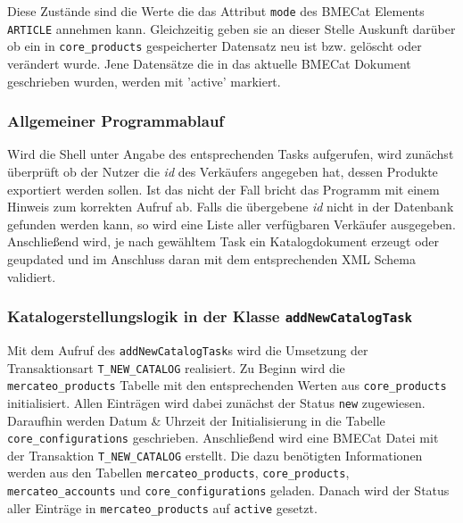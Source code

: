 	Diese Zustände sind die Werte die das Attribut \texttt{mode} des BMECat Elements \texttt{ARTICLE} annehmen kann. Gleichzeitig geben sie an dieser Stelle Auskunft darüber ob ein in \texttt{core\_products} gespeicherter Datensatz neu ist bzw. gelöscht oder verändert wurde. Jene Datensätze die in das aktuelle BMECat Dokument geschrieben wurden, werden mit 'active' markiert.
	
	\subsubsection{Allgemeiner Programmablauf}
	
	Wird die Shell unter Angabe des entsprechenden Tasks aufgerufen, wird zunächst überprüft ob der Nutzer die \textit{id} des Verkäufers angegeben hat, dessen Produkte exportiert werden sollen. Ist das nicht der Fall bricht das Programm mit einem Hinweis zum korrekten Aufruf ab. Falls die übergebene \textit{id} nicht in der Datenbank gefunden werden kann, so wird eine Liste aller verfügbaren Verkäufer ausgegeben. Anschließend wird, je nach gewähltem Task ein Katalogdokument erzeugt oder geupdated und im Anschluss daran mit dem entsprechenden XML Schema validiert. 
	
	\subsubsection{Katalogerstellungslogik in der Klasse \texttt{addNewCatalogTask}}
	
	Mit dem Aufruf des \texttt{addNewCatalogTask}s wird die Umsetzung der Transaktionsart \texttt{T\_NEW\_CATALOG} realisiert. Zu Beginn wird die \texttt{mercateo\_products} Tabelle mit den entsprechenden Werten aus \texttt{core\_products} initialisiert. Allen Einträgen wird dabei zunächst der Status \texttt{new} zugewiesen. Daraufhin werden Datum \& Uhrzeit der Initialisierung in die Tabelle \texttt{core\_configurations} geschrieben. Anschließend wird eine BMECat Datei mit der Transaktion \texttt{T\_NEW\_CATALOG} erstellt. Die dazu benötigten Informationen werden aus den Tabellen \texttt{mercateo\_products}, \texttt{core\_products}, \texttt{mercateo\_accounts} und \texttt{core\_configurations} geladen. Danach wird der Status aller Einträge in \texttt{mercateo\_products} auf \texttt{active} gesetzt. 
	
